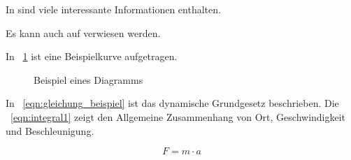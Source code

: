\label{cha:versuchsaufbau}

In \cite{meh10} sind viele interessante Informationen enthalten.

Es kann auch auf \cite{laser2016} verwiesen werden.

In \figurename~\ref{fig:diagramm_beispiel} ist eine Beispielkurve aufgetragen.


\begin{figure}[H]
\centering
{}
\caption[Kurze Bezeichnung des Diagramms f"ur das Abbildungsverzeichnis]{Beispiel eines Diagramms\atlbe}
\label{fig:diagramm_beispiel}
\end{figure}


In \Gl~\ref{eqn:gleichung_beispiel} ist das dynamische Grundgesetz beschrieben. Die \Gl~\ref{eqn:integral1} zeigt den Allgemeine Zusammenhang von Ort, Geschwindigkeit und Beschleunigung. 

\begin{equation}
	F = m \cdot a
\label{eqn:gleichung_beispiel}
\end{equation}

